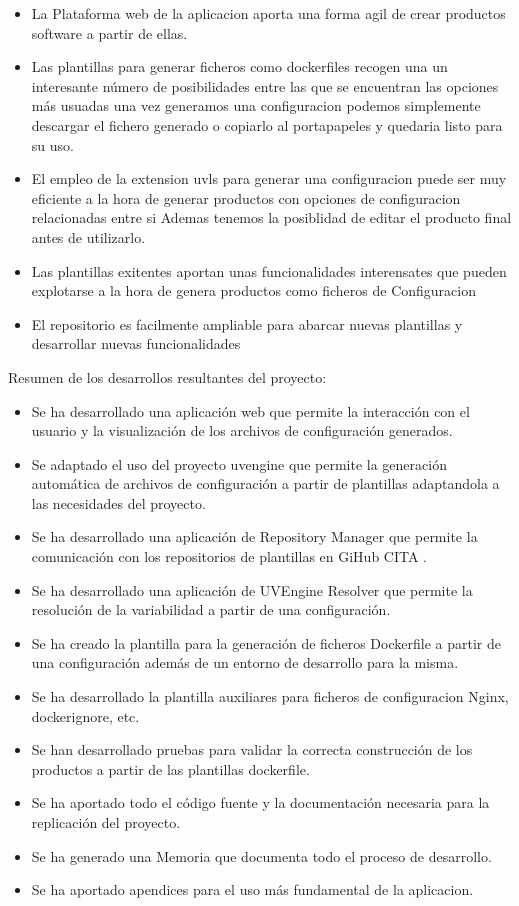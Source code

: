 \documentclass[12pt, a4paper, twoside]{article}
\begin{document}
\begin{itemize}
\item La Plataforma web de la aplicacion aporta una forma agil de crear productos software a partir de ellas.

\item Las plantillas para generar ficheros como dockerfiles recogen una un interesante número de posibilidades entre las que se encuentran las opciones más usuadas
una vez generamos una configuracion podemos simplemente descargar el fichero generado o copiarlo al portapapeles y quedaria listo para su uso.

\item El empleo de la extension uvls para generar una configuracion puede ser muy eficiente a la hora de generar productos con opciones de configuracion relacionadas entre si
Ademas tenemos la posiblidad de editar el producto final antes de utilizarlo.

\item Las plantillas exitentes aportan unas funcionalidades interensates que pueden explotarse a la hora de genera productos como ficheros de Configuracion

\item El repositorio es facilmente ampliable para abarcar nuevas plantillas y desarrollar nuevas funcionalidades
\end{itemize}

\newpage 

Resumen de los desarrollos resultantes del proyecto:
\begin{itemize}
	\item Se ha desarrollado una aplicación web que permite la interacción con el usuario y la visualización de los archivos de configuración generados.
	\item Se adaptado el uso del proyecto uvengine que permite la generación automática de archivos de configuración a partir de plantillas adaptandola a las necesidades del proyecto.
	\item Se ha desarrollado una aplicación de Repository Manager que permite la comunicación con los repositorios de plantillas en GiHub CITA .
	\item Se ha desarrollado una aplicación de UVEngine Resolver que permite la resolución de la variabilidad a partir de una configuración.
	\item Se ha creado la plantilla para la generación de ficheros Dockerfile a partir de una configuración además de un entorno de desarrollo para la misma.
	\item Se ha desarrollado la plantilla auxiliares para ficheros de configuracion Nginx, dockerignore, etc.
	\item Se han desarrollado pruebas para validar la correcta construcción de los productos a partir de las plantillas dockerfile.
	\item Se ha aportado todo el código fuente y la documentación necesaria para la replicación del proyecto.
	\item Se ha generado una Memoria que documenta todo el proceso de desarrollo.
	\item Se ha aportado apendices para el uso más fundamental de la aplicacion.
\end{itemize}
\end{document}
